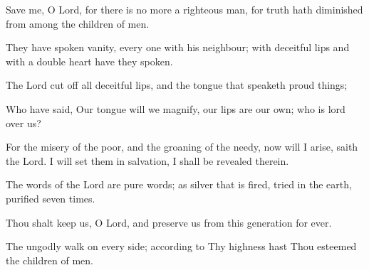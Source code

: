 Save me, O Lord, for there is no more a righteous man, for truth hath diminished from among the children of men.

They have spoken vanity, every one with his neighbour; with deceitful lips and with a double heart have they spoken.

The Lord cut off all deceitful lips, and the tongue that speaketh proud things;

Who have said, Our tongue will we magnify, our lips are our own; who is lord over us?

For the misery of the poor, and the groaning of the needy, now will I arise, saith the Lord. I will set them in salvation, I shall be
revealed therein.

The words of the Lord are pure words; as silver that is fired, tried in the earth, purified seven times.

Thou shalt keep us, O Lord, and preserve us from this generation for ever.

The ungodly walk on every side; according to Thy highness hast Thou esteemed the children of men.
